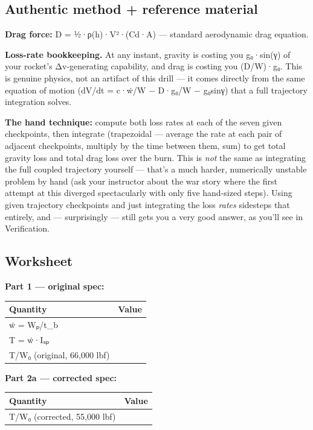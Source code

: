 \documentclass[
  10pt,
]{article}
\begin{document}
\hypertarget{authentic-method-reference-material}{%
\subsection{Authentic method + reference
material}\label{authentic-method-reference-material}}

\textbf{Drag force:} D = ½·ρ(h)·V²·(Cd·A) --- standard aerodynamic drag
equation.

\textbf{Loss-rate bookkeeping.} At any instant, gravity is costing you
g₀·sin(γ) of your rocket's Δv-generating capability, and drag is costing
you (D/W)·g₀. This is genuine physics, not an artifact of this drill ---
it comes directly from the same equation of motion (dV/dt = c·ẇ/W −
D·g₀/W − g₀sinγ) that a full trajectory integration solves.

\textbf{The hand technique:} compute both loss rates at each of the
seven given checkpoints, then integrate (trapezoidal --- average the
rate at each pair of adjacent checkpoints, multiply by the time between
them, sum) to get total gravity loss and total drag loss over the burn.
This is \emph{not} the same as integrating the full coupled trajectory
yourself --- that's a much harder, numerically unstable problem by hand
(ask your instructor about the war story where the first attempt at this
diverged spectacularly with only five hand-sized steps). Using given
trajectory checkpoints and just integrating the loss \emph{rates}
sidesteps that entirely, and --- surprisingly --- still gets you a very
good answer, as you'll see in Verification.

\hypertarget{worksheet}{%
\subsection{Worksheet}\label{worksheet}}

\textbf{Part 1 --- original spec:}

\begin{longtable}[]{@{}ll@{}}
\toprule
Quantity & Value\tabularnewline
\midrule
\endhead
ẇ = Wₚ/t\_b &\tabularnewline
T = ẇ·Iₛₚ &\tabularnewline
T/W₀ (original, 66,000 lbf) &\tabularnewline
\bottomrule
\end{longtable}

\textbf{Part 2a --- corrected spec:}

\begin{longtable}[]{@{}ll@{}}
\toprule
Quantity & Value\tabularnewline
\midrule
\endhead
T/W₀ (corrected, 55,000 lbf) &\tabularnewline
\bottomrule
\end{longtable}
\end{document}
